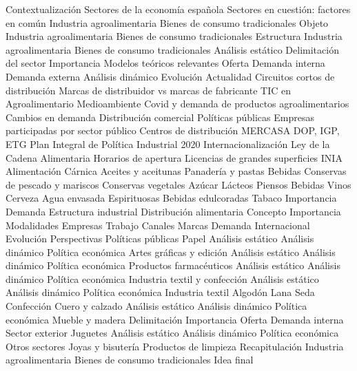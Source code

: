 \documentclass{nuevotema}
\begin{document}
\begin{esquema}[enumerate]
	\1[] 
		\2 Contextualización
			\3 Sectores de la economía española
			\3 Sectores en cuestión: factores en común
			\3 Industria agroalimentaria
			\3 Bienes de consumo tradicionales
		\2 Objeto
			\3 Industria agroalimentaria
			\3 Bienes de consumo tradicionales
		\2 Estructura
			\3 Industria agroalimentaria
			\3 Bienes de consumo tradicionales
	\1 
		\2 Análisis estático
			\3 Delimitación del sector
			\3 Importancia
			\3 Modelos teóricos relevantes
			\3 Oferta
			\3 Demanda interna
			\3 Demanda externa
		\2 Análisis dinámico
			\3 Evolución
			\3 Actualidad
			\3 Circuitos cortos de distribución
			\3 Marcas de distribuidor vs marcas de fabricante
			\3 TIC en Agroalimentario
			\3 Medioambiente
			\3 Covid y demanda de productos agroalimentarios
			\3 Cambios en demanda
			\3 Distribución comercial
		\2 Políticas públicas
			\3 Empresas participadas por sector público
			\3 Centros de distribución MERCASA
			\3 DOP, IGP, ETG
			\3 Plan Integral de Política Industrial 2020
			\3 Internacionalización
			\3 Ley de la Cadena Alimentaria
			\3 Horarios de apertura
			\3 Licencias de grandes superficies
			\3 INIA
		\2 Alimentación
			\3 Cárnica
			\3 Aceites y aceitunas
			\3 Panadería y pastas
			\3 Bebidas
			\3 Conservas de pescado y mariscos
			\3 Conservas vegetales
			\3 Azúcar
			\3 Lácteos
			\3 Piensos
		\2 Bebidas
			\3 Vinos
			\3 Cerveza
			\3 Agua envasada
			\3 Espirituosas
			\3 Bebidas edulcoradas
		\2 Tabaco
			\3 Importancia
			\3 Demanda
			\3 Estructura industrial
		\2 Distribución alimentaria
			\3 Concepto
			\3 Importancia
			\3 Modalidades
			\3 Empresas
			\3 Trabajo
			\3 Canales
			\3 Marcas
			\3 Demanda
			\3 Internacional
			\3 Evolución
			\3 Perspectivas
			\3 Políticas públicas
	\1 
		\2 Papel
			\3 Análisis estático
			\3 Análisis dinámico
			\3 Política económica
		\2 Artes gráficas y edición
			\3 Análisis estático
			\3 Análisis dinámico
			\3 Política económica
		\2 Productos farmacéuticos
			\3 Análisis estático
			\3 Análisis dinámico
			\3 Política económica
		\2 Industria textil y confección
			\3 Análisis estático
			\3 Análisis dinámico
			\3 Política económica
			\3 Industria textil
			\3 Algodón
			\3 Lana
			\3 Seda
			\3 Confección
		\2 Cuero y calzado
			\3 Análisis estático
			\3 Análisis dinámico
			\3 Política económica
		\2 Mueble y madera
			\3 Delimitación
			\3 Importancia
			\3 Oferta
			\3 Demanda interna
			\3 Sector exterior
		\2 Juguetes
			\3 Análisis estático
			\3 Análisis dinámico
			\3 Política económica
		\2 Otros sectores
			\3 Joyas y bisutería
			\3 Productos de limpieza
	\1[] 
		\2 Recapitulación
			\3 Industria agroalimentaria
			\3 Bienes de consumo tradicionales
		\2 Idea final

\end{esquema}
\end{document}
